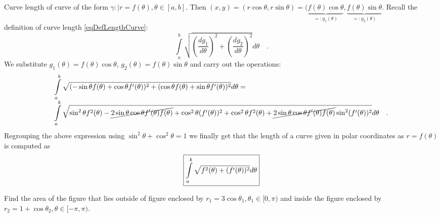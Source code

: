 \documentclass[12pt]{book}
\newcommand{\importantFormula}[1]{\begin{equation} \boxed{#1} \end{equation}}
\begin{document}
Curve length of curve of the form $\gamma:|r=f(\theta),\theta\in [a,b]$. Then $(x,y)= (r\cos\theta, r\sin \theta)= (\underbrace{f(\theta)\cos\theta}_{=:g_1(\theta)}, \underbrace{ f(\theta)\sin\theta}_{=:g_2(\theta)} $. Recall the definition of curve length \eqref{eqDefLengthCurve}:
\[
\int\limits_{a}^b\sqrt{\left(\frac{dg_1}{d\theta}\right)^2+\left(\frac{dg_2}{d\theta}\right)^2}d\theta \quad.
\]
We substitute $g_1(\theta)=f(\theta)\cos\theta$, $g_2(\theta)=f(\theta)\sin\theta$ and carry out the operations:
\[
\begin{array}{l}
\displaystyle\int\limits_{a}^b\sqrt{ (-\sin\theta f(\theta) + \cos\theta f'(\theta) )^2+(\cos\theta f(\theta)+\sin \theta f'(\theta) )^2}d\theta=\\ 
\displaystyle \int \limits_{a}^b \sqrt{\sin^2\theta f^2(\theta)- \cancel{2\sin\theta\cos\theta f'(\theta)f(\theta)}+\cos^2\theta (f'(\theta))^2+ \cos^2\theta f^2(\theta)+\cancel{2\sin\theta\cos\theta f'(\theta)f(\theta)} \sin^2 (f'(\theta))^2 }d\theta\quad .
\end{array}
\]
Regrouping the above expression using $\sin^2\theta+\cos^2\theta=1$ we finally get that the length of a curve given in polar coordinates as $r=f(\theta)$ is computed as
\importantFormula{\label{eqCurveLengthPolarCoords}
\int\limits_{a}^b \sqrt{f^2(\theta)+ (f'(\theta))^2}d\theta
}

Find the area of the figure that lies outside of figure enclosed by $r_1=3\cos\theta_1, \theta_1\in [0,\pi)$ and inside the figure enclosed by $r_2=1+\cos\theta_2, \theta\in [-\pi,\pi)$. %
\end{document}
